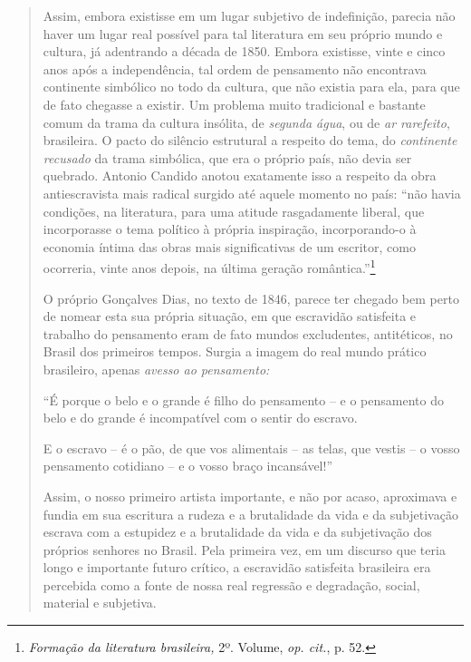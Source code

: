 \begin{quote}
Assim, embora existisse em um lugar subjetivo de indefinição, parecia
não haver um lugar real possível para tal literatura em seu próprio
mundo e cultura, já adentrando a década de 1850. Embora existisse, vinte
e cinco anos após a independência, tal ordem de pensamento não
encontrava continente simbólico no todo da cultura, que não existia para
ela, para que de fato chegasse a existir. Um problema muito tradicional
e bastante comum da trama da cultura insólita, de \emph{segunda água},
ou de \emph{ar rarefeito}, brasileira. O pacto do silêncio estrutural a
respeito do tema, do \emph{continente recusado} da trama simbólica, que
era o próprio país, não devia ser quebrado. Antonio Candido anotou
exatamente isso a respeito da obra antiescravista mais radical surgido
até aquele momento no país: ``não havia condições, na literatura, para
uma atitude rasgadamente liberal, que incorporasse o tema político à
própria inspiração, incorporando-o à economia íntima das obras mais
significativas de um escritor, como ocorreria, vinte anos depois, na
última geração romântica.''\footnote{\emph{Formação da literatura
  brasileira,} 2º. Volume, \emph{op. cit.}, p. 52.}

O próprio Gonçalves Dias, no texto de 1846, parece ter chegado bem perto
de nomear esta sua própria situação, em que escravidão satisfeita e
trabalho do pensamento eram de fato mundos excludentes, antitéticos, no
Brasil dos primeiros tempos. Surgia a imagem do real mundo prático
brasileiro, apenas \emph{avesso ao pensamento: }

``É porque o belo e o grande é filho do pensamento -- e o pensamento do
belo e do grande é incompatível com o sentir do escravo.

E o escravo -- é o pão, de que vos alimentais -- as telas, que vestis --
o vosso pensamento cotidiano -- e o vosso braço incansável!''

Assim, o nosso primeiro artista importante, e não por acaso, aproximava
e fundia em sua escritura a rudeza e a brutalidade da vida e da
subjetivação escrava com a estupidez e a brutalidade da vida e da
subjetivação dos próprios senhores no Brasil. Pela primeira vez, em um
discurso que teria longo e importante futuro crítico, a escravidão
satisfeita brasileira era percebida como a fonte de nossa real regressão
e degradação, social, material e subjetiva.


\end{quote}
